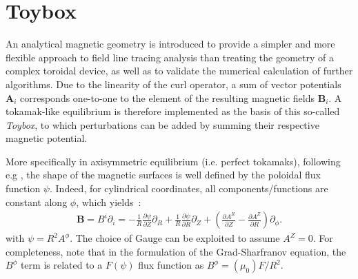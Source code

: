 \chapter{Toybox}
An analytical magnetic geometry is introduced to provide a simpler and more flexible approach to field line tracing analysis than treating the geometry of a complex toroidal device, as well as to validate the numerical calculation of further algorithms. Due to the linearity of the curl operator, a sum of vector potentials $\textbf{A}_i$ corresponds one-to-one to the element of the resulting magnetic fields $\textbf{B}_i$. A tokamak-like equilibrium is therefore implemented as the basis of this so-called \textit{Toybox}, to which perturbations can be added by summing their respective magnetic potential.

More specifically in axisymmetric equilibrium (i.e. perfect tokamaks), following e.g \cite[p.108]{wesson_tokamaks_2011}, the shape of the magnetic surfaces is well defined by the poloidal flux function $\psi$. Indeed, for cylindrical coordinates, all components/functions are constant along $\phi$, which yields~:
\begin{align*}
    \textbf{B} = B^i\partial_i = -\frac{1}{R}\frac{\partial\psi}{\partial Z}\partial_R +\frac{1}{R}\frac{\partial\psi}{\partial R}\partial_Z + \left(\frac{\partial A^R}{\partial Z} - \frac{\partial A^Z}{\partial R}\right)\partial_\phi.
\end{align*}
with $\psi = R^2 A^\phi$. The choice of Gauge can be exploited to assume $A^Z = 0$. For completeness, note that in the formulation of the Grad-Sharfranov equation, the $B^\phi$ term is related to a $F(\psi)$ flux function as $B^\phi = (\mu_0) F/R^2$.

